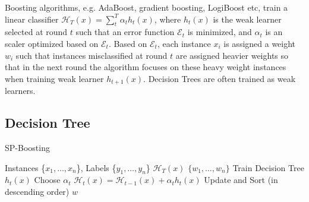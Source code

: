 Boosting algorithms, e.g. AdaBoost, gradient boosting, LogiBoost etc, train a linear classifier $\mathcal{H}_T(x)=\sum^T_t {\alpha_t h_t(x)}$, where $h_t(x)$ is the weak learner selected at round $t$ such that an error function $\mathcal{E}_t$ is minimized, and $\alpha_t$ is an scaler optimized based on $\mathcal{E}_t$. Based on $\mathcal{E}_t$, each instance $x_i$ is assigned a weight $w_i$ such that instances misclassified at round $t$ are assigned heavier weights so that in the next round the algorithm focuses on these heavy weight instances when training weak learner $h_{t+1}(x)$. Decision Trees are often trained as weak learners.

\subsection{Decision Tree}

\begin{algorithm}[H]
\caption{SP-Boosting}\label{boosting}
\begin{algorithmic}
    Instances \{$x_1, \dots, x_n$\}, Labels \{$y_1, \dots, y_n$\}
    $\mathcal{H}_T(x)$
    $\{w_{1},\dots,w_{n}\}$   
   \STATE Train Decision Tree $h_t(x)$
   \STATE Choose $\alpha_t$
   \STATE $\mathcal{H}_t(x)=\mathcal{H}_{t-1}(x) + \alpha_t h_t(x)$
   \STATE Update and Sort (in descending order) $w$
   \ENDFOR
\end{algorithmic}
\end{algorithm}